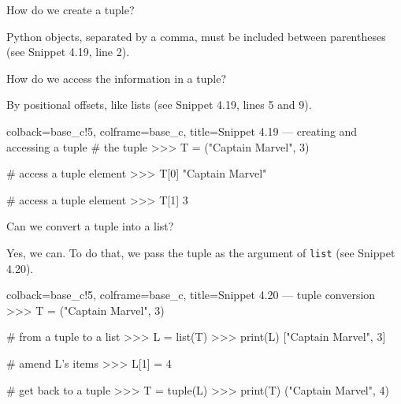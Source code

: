 \documentclass[a4paper,11pt]{book}
\numberwithin{figure}{chapter}
\numberwithin{table}{chapter}
\newcommand{\question}[1]{%
    \begin{tcolorbox}[colback=comp_c!10,colframe=comp_c,sidebyside align=top,width=\linewidth,before skip=1ex]
        #1
    \end{tcolorbox}
    \switchcolumn%
}
\newcommand{\note}[1]{%
    \begin{tcolorbox}[colback=white!0,colframe=white!10,width=\linewidth,before skip=1ex]
        #1
    \end{tcolorbox}
}
\begin{document}
\begin{paracol}{2}
	\question{\raggedright How do we create a tuple?}
	\note{Python objects, separated by a comma, must be included between parentheses (see Snippet 4.19, line 2).}
\end{paracol}

\begin{paracol}{2}
	\question{\raggedright How do we access the information in a tuple?}
	\note{By positional offsets, like lists (see Snippet 4.19, lines 5 and 9).}
\end{paracol}

\begin{pythoncode}[linenos=true,]{colback=base_c!5, colframe=base_c, title=\sffamily Snippet 4.19 --- creating and accessing a tuple}
# the tuple
>>> T = ("Captain Marvel", 3)

# access a tuple element
>>> T[0]
"Captain Marvel"

# access a tuple element
>>> T[1]
3
\end{pythoncode}

\begin{paracol}{2}
	\question{\raggedright Can we convert a tuple into a list?}
	\note{Yes, we can. To do that, we pass the tuple as the argument of \texttt{list} (see Snippet 4.20).}
\end{paracol}

\begin{pythoncode}[linenos=true,]{colback=base_c!5, colframe=base_c, title=\sffamily Snippet 4.20 --- tuple conversion}
>>> T = ("Captain Marvel", 3)

# from a tuple to a list
>>> L = list(T)
>>> print(L)
["Captain Marvel", 3]

# amend L's items
>>> L[1] = 4

# get back to a tuple
>>> T = tuple(L)
>>> print(T)
("Captain Marvel", 4)
\end{pythoncode}
\clearpage
\end{document}
